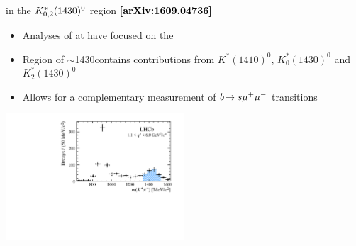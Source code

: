 \documentclass[aspectratio=1610]{beamer}
\def\Kstarfourteenthirty  {{\ensuremath{\kaon^{*}_{0,2}(1430)^{0}}}\xspace}
\begin{document}
\begin{frame}{\BdToKpimm in the \Kstarfourteenthirty region \hspace{0pt plus 1 filll} {\small \bf \textcolor{black}{[arXiv:1609.04736]}}}
\begin{itemize}
\item Analyses of \BdToKpimm at \lhcb have focused on the \KstP
\item Region of \mkpi $\sim$1430\mevcc contains contributions from $K^\ast(1410)^0$, $K^\ast_0(1430)^0$ and $K^\ast_2(1430)^0$
\item Allows for a complementary measurement of ${b}\!\rightarrow {\ensuremath{s}}{\ensuremath{\mu^+}}{\ensuremath{\mu^-}}$ transitions
\end{itemize}

\bigskip
\centering
\includegraphics[width=0.5\textwidth]{figs/kpimm/introduction/full-mkpi.pdf}
\end{frame}
\end{document}
